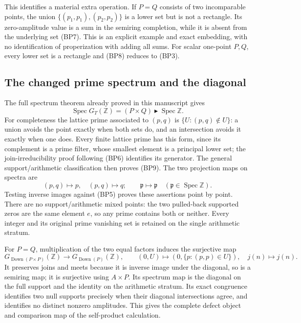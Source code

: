 This identifies a material extra operation. If $P=Q$ consists of
two incomparable points, the union
$\{(p_1,p_1),(p_2,p_2)\}$ is a lower set but is not a rectangle.
Its zero-amplitude value is a sum in the semiring completion, while
it is absent from the underlying set (BP7). This is an explicit
example and exact embedding, with no identification of properization
with adding all sums. For scalar one-point $P,Q$, every lower set
is a rectangle and (BP8) reduces to (BP3).

\subsection{The changed prime spectrum and the diagonal}

The full spectrum theorem already proved in this manuscript gives
\[
 \operatorname{Spec}G_T(\mathbb Z)
     =(P\times Q)\mathbin{\blacktriangleright}\operatorname{Spec}\mathbb Z.
 \tag{BP9}
\]
For completeness the lattice prime associated to $(p,q)$ is
$\{U:(p,q)\notin U\}$: a union avoids the point exactly when
both sets do, and an intersection avoids it exactly when one does.
Every finite lattice prime has this form, since its complement is
a prime filter, whose smallest element is a principal lower set;
the join-irreducibility proof following (BP6) identifies its generator.
The general support/arithmetic classification then proves (BP9).
The two projection maps on spectra are
\[
 (p,q)\mapsto p,\quad (p,q)\mapsto q;
 \qquad \mathfrak p\mapsto\mathfrak p
       \quad(\mathfrak p\in\operatorname{Spec}\mathbb Z).
 \tag{BP10}
\]
Testing inverse images against (BP5) proves these assertions point
by point. There are no support/arithmetic mixed points: the two
pulled-back supported zeros are the same element $e$, so any prime
contains both or neither. Every integer and its original prime
vanishing set is retained on the single arithmetic stratum.

For $P=Q$, multiplication of the two equal factors induces the
surjective map
\[
 G_{\operatorname{Down}(P\times P)}(\mathbb Z)
       \longrightarrow G_{\operatorname{Down}(P)}(\mathbb Z),
 \qquad (0,U)\mapsto(0,\{p:(p,p)\in U\}),
 \quad j(n)\mapsto j(n).
 \tag{BP11}
\]
It preserves joins and meets because it is inverse image under
the diagonal, so is a semiring map; it is surjective using $A\times P$.
Its spectrum map is the diagonal on the full support and the identity
on the arithmetic stratum. Its exact congruence identifies two null
supports precisely when their diagonal intersections agree, and
identifies no distinct nonzero amplitudes. This gives the complete
defect object and comparison map of the self-product calculation.

